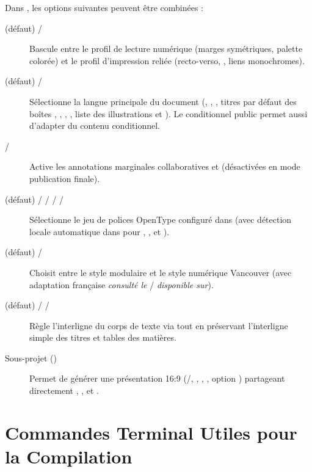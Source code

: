 Dans , les options suivantes peuvent être combinées :
\begin{description}
  \item[ (défaut) / ] Bascule entre le profil de lecture numérique (marges symétriques, palette colorée) et le profil d'impression reliée (recto-verso, , liens monochromes).
  \item[ (défaut) / ] Sélectionne la langue principale du document (, , , titres par défaut des boîtes , , , , liste des illustrations et ). Le conditionnel public  permet aussi d'adapter du contenu conditionnel.
  \item[ / ] Active les annotations marginales collaboratives  et  (désactivées en mode publication finale).
  \item[ (défaut) /  /  /  / ] Sélectionne le jeu de polices OpenType configuré dans  (avec détection locale automatique dans  pour , ,  et ).
  \item[ (défaut) / ] Choisit entre le style modulaire  et le style numérique Vancouver (avec adaptation française \emph{consulté le} / \emph{disponible sur}).
  \item[ (défaut) /  / ] Règle l'interligne du corps de texte via  tout en préservant l'interligne simple des titres et tables des matières.
  \item[Sous-projet  ()] Permet de générer une présentation 16:9 (/, , , , option ) partageant directement , ,  et .
\end{description}

\section{Commandes Terminal Utiles pour la Compilation}
\label{sec:commandes-terminal}

